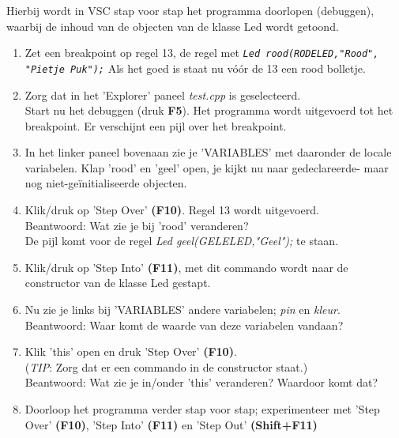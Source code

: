 	\begin{opdracht}
Hierbij wordt in VSC stap voor stap het programma doorlopen (debuggen), waarbij de inhoud van de objecten van de klasse Led wordt getoond.

	
	\begin{enumerate}[label=\alph*)]
	
	\item Zet een breakpoint op regel 13, de regel met \texttt{\textit{Led rood(RODELED,"Rood", "Pietje Puk");}} Als het goed is staat nu vóór de 13 een rood bolletje.
	
	\item Zorg dat in het 'Explorer' paneel \textit{test.cpp} is geselecteerd. \\Start nu het debuggen (druk \textbf{F5}). Het programma wordt uitgevoerd tot het breakpoint.  Er verschijnt een pijl over het breakpoint. 
	\item In het linker paneel bovenaan zie je 'VARIABLES' met daaronder de locale variabelen. Klap 'rood' en 'geel' open, je kijkt nu naar gedeclareerde- maar nog niet-geïnitialiseerde objecten.
	\item Klik/druk op 'Step Over' \textbf{(F10)}. Regel 13 wordt uitgevoerd. 
	\\ Beantwoord: Wat zie je bij 'rood' veranderen? \\
	De pijl komt voor de regel \textit{Led geel(GELELED,"Geel");} te staan.
	\item Klik/druk op 'Step Into' \textbf{(F11)}, met dit commando wordt naar de constructor van de klasse Led gestapt. 
	\item Nu zie je links bij 'VARIABLES' andere variabelen; \textit{pin} en \textit{kleur}. \\Beantwoord: Waar komt de waarde van deze variabelen vandaan?
	\item Klik 'this' open en druk 'Step Over' \textbf{(F10)}.  \\(\textit{TIP}: Zorg dat er een commando in de constructor staat.) 
	\\Beantwoord: Wat zie je in/onder 'this' veranderen? Waardoor komt dat?
	\item Doorloop het programma verder stap voor stap; experimenteer met 'Step Over' \textbf{(F10)}, 'Step Into' \textbf{(F11)} en 'Step Out' \textbf{(Shift+F11)}
\end{enumerate}
	
\end{opdracht}

